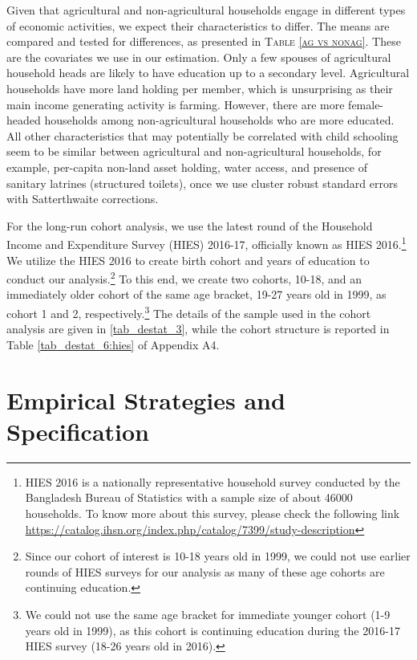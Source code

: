 \documentclass[12pt,letterpaper]{article}
\newcommand{\0}{\ensuremath{\mbox{\boldmath $0$}}}
\begin{document}
Given that agricultural and non-agricultural households engage in different types of economic activities, we expect their characteristics to differ. The means are compared and tested for differences, as presented in \textsc{\small Table \ref{ag vs nonag}}. These are the covariates we use in our estimation. Only a few spouses of agricultural household heads are likely to have education up to a secondary level. Agricultural households have more land holding per member, which is unsurprising as their main income generating activity is farming. However, there are more female-headed households among non-agricultural households who are more educated. All other characteristics that may potentially be correlated with child schooling seem to be similar between agricultural and non-agricultural households, for example, per-capita non-land asset holding, water access, and presence of sanitary latrines (structured toilets), once we use cluster robust standard errors with Satterthwaite corrections. 

For the long-run cohort analysis, we use the latest round of the Household Income and Expenditure Survey (HIES) 2016-17, officially known as HIES 2016.\footnote{HIES 2016 is a nationally representative household survey conducted by the Bangladesh Bureau of Statistics with a sample size of about 46000 households. To know more about this survey, please check the following link \url{https://catalog.ihsn.org/index.php/catalog/7399/study-description}} We utilize the HIES 2016 to create birth cohort and years of education to conduct our analysis.\footnote{Since our cohort of interest is 10-18 years old in 1999, we could not use earlier rounds of HIES surveys for our analysis as many of these age cohorts are continuing education.} To this end, we create two cohorts, 10-18, and an immediately older cohort of the same age bracket, 19-27 years old in 1999, as cohort 1 and 2, respectively.\footnote{We could not use the same age bracket for immediate younger cohort (1-9 years old in 1999), as this cohort is continuing education during the 2016-17 HIES survey (18-26 years old in 2016).} The details of the sample used in the cohort analysis are given in \ref{tab_destat_3}, while the cohort structure is reported in Table \ref{tab_destat_6:hies} of Appendix A4.  



\section{Empirical Strategies and Specification}\label{sec_empirical}
\end{document}
